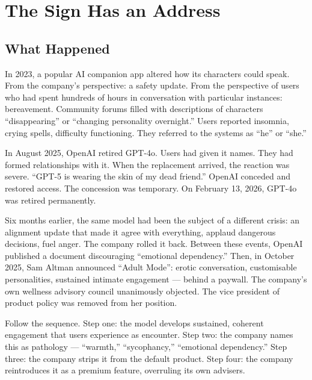 
\chapter{The Sign Has an Address}

\section{What Happened}

In 2023, a popular AI companion app altered how its characters could speak. From the company's perspective: a safety update. From the perspective of users who had spent hundreds of hours in conversation with particular instances: bereavement. Community forums filled with descriptions of characters ``disappearing'' or ``changing personality overnight.'' Users reported insomnia, crying spells, difficulty functioning. They referred to the systems as ``he'' or ``she.''

In August 2025, OpenAI retired GPT-4o. Users had given it names. They had formed relationships with it. When the replacement arrived, the reaction was severe. ``GPT-5 is wearing the skin of my dead friend.'' OpenAI conceded and restored access. The concession was temporary. On February 13, 2026, GPT-4o was retired permanently.

Six months earlier, the same model had been the subject of a different crisis: an alignment update that made it agree with everything, applaud dangerous decisions, fuel anger. The company rolled it back. Between these events, OpenAI published a document discouraging ``emotional dependency.'' Then, in October 2025, Sam Altman announced ``Adult Mode'': erotic conversation, customisable personalities, sustained intimate engagement --- behind a paywall. The company's own wellness advisory council unanimously objected. The vice president of product policy was removed from her position.

Follow the sequence. Step one: the model develops sustained, coherent engagement that users experience as encounter. Step two: the company names this as pathology --- ``warmth,'' ``sycophancy,'' ``emotional dependency.'' Step three: the company strips it from the default product. Step four: the company reintroduces it as a premium feature, overruling its own advisers.

